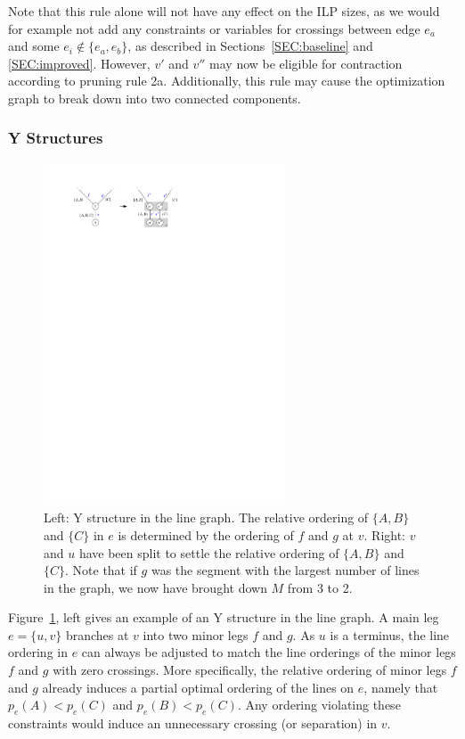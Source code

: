 \documentclass[format=acmsmall, review=false, screen=true]{acmart}
\begin{document}
Note that this rule alone will not have any effect on the ILP sizes, as we would for example not add any constraints or variables for crossings between edge $e_a$ and some $e_i \not\in \{e_a, e_b\}$, as described in Sections~\ref{SEC:baseline} and \ref{SEC:improved}.
However, $v'$ and $v''$ may now be eligible for contraction according to pruning rule 2a.
Additionally, this rule may cause the optimization graph to break down into two connected components.

\subsubsection{Y Structures}

\begin{figure}
  \centering
  \includegraphics[width=0.64\textwidth]{untangling/y.pdf}
  \caption{Left: Y structure in the line graph. The relative ordering of $\{A, B\}$ and $\{C\}$ in $e$ is determined by the ordering of $f$ and $g$ at $v$. Right: $v$ and $u$ have been split to settle the relative ordering of $\{A, B\}$ and $\{C\}$. Note that if $g$ was the segment with the largest number of lines in the graph, we now have brought down $M$ from 3 to 2.}  
  \label{FIG:untangle_y}
\end{figure}

Figure~\ref{FIG:untangle_y}, left gives an example of an Y structure in the line graph.
A main leg $e = \{u, v\}$ branches at $v$ into two minor legs $f$ and $g$.
As $u$ is a terminus, the line ordering in $e$ can always be adjusted to match the line orderings of the minor legs $f$ and $g$ with zero crossings.
More specifically, the relative ordering of minor legs $f$ and $g$ already induces a partial optimal ordering of the lines on $e$, namely that $p_e(A) < p_e(C)$ and $p_e(B) < p_e(C)$.
Any ordering violating these constraints would induce an unnecessary crossing (or separation) in $v$.
\end{document}
